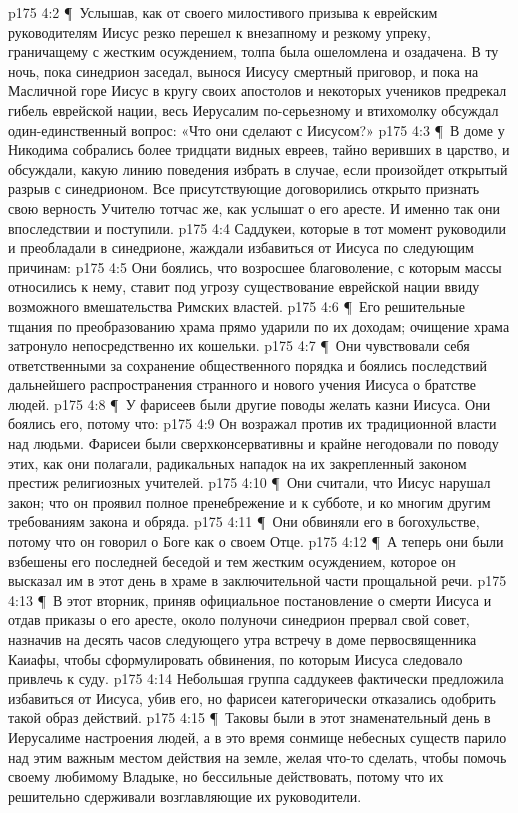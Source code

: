 \vs p175 4:2 \P\ Услышав, как от своего милостивого призыва к еврейским руководителям Иисус резко перешел к внезапному и резкому упреку, граничащему с жестким осуждением, толпа была ошеломлена и озадачена. В ту ночь, пока синедрион заседал, вынося Иисусу смертный приговор, и пока на Масличной горе Иисус в кругу своих апостолов и некоторых учеников предрекал гибель еврейской нации, весь Иерусалим по\hyp{}серьезному и втихомолку обсуждал один\hyp{}единственный вопрос: «Что они сделают с Иисусом?»
\vs p175 4:3 \P\ В доме у Никодима собрались более тридцати видных евреев, тайно веривших в царство, и обсуждали, какую линию поведения избрать в случае, если произойдет открытый разрыв с синедрионом. Все присутствующие договорились открыто признать свою верность Учителю тотчас же, как услышат о его аресте. И именно так они впоследствии и поступили.
\vs p175 4:4 Саддукеи, которые в тот момент руководили и преобладали в синедрионе, жаждали избавиться от Иисуса по следующим причинам:
\vs p175 4:5 \bibnobreakspace Они боялись, что возросшее благоволение, с которым массы относились к нему, ставит под угрозу существование еврейской нации ввиду возможного вмешательства Римских властей.
\vs p175 4:6 \P\ \bibnobreakspace Его решительные тщания по преобразованию храма прямо ударили по их доходам; очищение храма затронуло непосредственно их кошельки.
\vs p175 4:7 \P\ \bibnobreakspace Они чувствовали себя ответственными за сохранение общественного порядка и боялись последствий дальнейшего распространения странного и нового учения Иисуса о братстве людей.
\vs p175 4:8 \P\ У фарисеев были другие поводы желать казни Иисуса. Они боялись его, потому что:
\vs p175 4:9 \bibnobreakspace Он возражал против их традиционной власти над людьми. Фарисеи были сверхконсервативны и крайне негодовали по поводу этих, как они полагали, радикальных нападок на их закрепленный законом престиж религиозных учителей.
\vs p175 4:10 \P\ \bibnobreakspace Они считали, что Иисус нарушал закон; что он проявил полное пренебрежение и к субботе, и ко многим другим требованиям закона и обряда.
\vs p175 4:11 \P\ \bibnobreakspace Они обвиняли его в богохульстве, потому что он говорил о Боге как о своем Отце.
\vs p175 4:12 \P\ \bibnobreakspace А теперь они были взбешены его последней беседой и тем жестким осуждением, которое он высказал им в этот день в храме в заключительной части прощальной речи.
\vs p175 4:13 \P\ В этот вторник, приняв официальное постановление о смерти Иисуса и отдав приказы о его аресте, около полуночи синедрион прервал свой совет, назначив на десять часов следующего утра встречу в доме первосвященника Каиафы, чтобы сформулировать обвинения, по которым Иисуса следовало привлечь к суду.
\vs p175 4:14 Небольшая группа саддукеев фактически предложила избавиться от Иисуса, убив его, но фарисеи категорически отказались одобрить такой образ действий.
\vs p175 4:15 \P\ Таковы были в этот знаменательный день в Иерусалиме настроения людей, а в это время сонмище небесных существ парило над этим важным местом действия на земле, желая что\hyp{}то сделать, чтобы помочь своему любимому Владыке, но бессильные действовать, потому что их решительно сдерживали возглавляющие их руководители.
